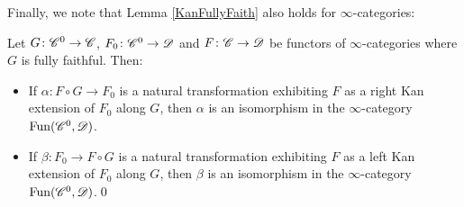 \documentclass[../../thesis.tex]{subfiles}
\begin{document}
Finally, we note that Lemma \ref{KanFullyFaith} also holds for $\infty$-categories:
\begin{proposition}\label{KanFullyFaithInfty}
    Let $G \colon \mathscr{C}^{0} \to \mathscr{C}$, $F_0\colon \mathscr{C}^{0} \to \mathscr{D}$ and $F\colon \mathscr{C} \to \mathscr{D}$ be functors of $\infty$-categories where $G$ is fully faithful.
    Then:
    \begin{itemize}
        \item If $\alpha \colon F \circ G \to F_0$ is a natural transformation exhibiting $F$ as a right Kan extension of $F_0$ along $G$, then $\alpha$ is an isomorphism in the $\infty$-category $\mathrm{Fun}(\mathscr{C}^{0}, \mathscr{D})$.
        \item If $\beta \colon F_0 \to F \circ G$ is a natural transformation exhibiting $F$ as a left Kan extension of $F_0$ along $G$, then $\beta$ is an isomorphism in the $\infty$-category $\mathrm{Fun}(\mathscr{C}^{0}, \mathscr{D})$.\qed
    \end{itemize}
\end{proposition}
\end{document}
